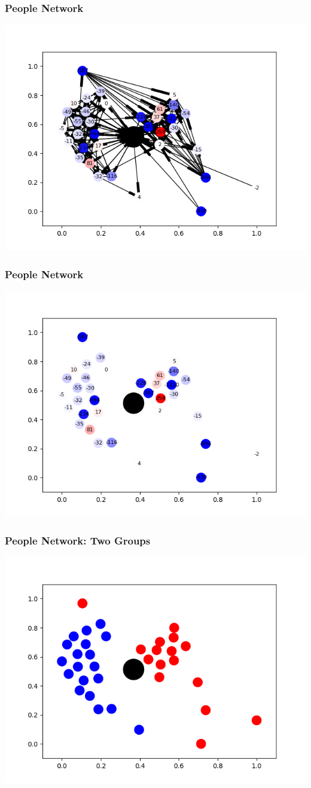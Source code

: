\documentclass{beamer}
\begin{document}
\begin{frame}\frametitle{People Network}
\centering
\includegraphics[width=\textwidth]{graph1.png}
\end{frame}
\begin{frame}\frametitle{People Network}
\centering
\includegraphics[width=\textwidth]{graph2.png}
\end{frame}
\begin{frame}\frametitle{People Network: Two Groups}
\centering
\includegraphics[width=\textwidth]{graph3.png}
\end{frame}
\end{document}
